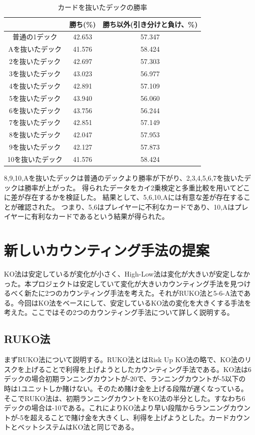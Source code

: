 \begin{table}[H]
 \caption{カードを抜いたデックの勝率\label{pullcard}}
 \begin{center}
  \begin{tabular}{|c|c|c|}
  \hline & 勝ち(\%) & 勝ち以外(引き分けと負け、\%) \\
  \hline 普通の1デック & 42.653 & 57.347\\
  \hline Aを抜いたデック & 41.576 & 58.424\\
  \hline 2を抜いたデック & 42.697 & 57.303\\
  \hline 3を抜いたデック & 43.023 & 56.977\\
  \hline 4を抜いたデック & 42.891 & 57.109\\
  \hline 5を抜いたデック & 43.940 & 56.060\\
  \hline 6を抜いたデック & 43.756 & 56.244\\
  \hline 7を抜いたデック & 42.851 & 57.149\\
  \hline 8を抜いたデック & 42.047 & 57.953\\
  \hline 9を抜いたデック & 42.127 & 57.873\\
  \hline 10を抜いたデック & 41.576 & 58.424\\
  \hline
  \end{tabular}
 \end{center}
\end{table}

8,9,10,Aを抜いたデックは普通のデックより勝率が下がり、2,3,4,5,6,7を抜いたデックは勝率が上がった。
得られたデータをカイ2乗検定と多重比較を用いてどこに差が存在するかを検証した。
結果として、5,6,10,Aには有意な差が存在することが確認された。
つまり、5,6はプレイヤーに不利なカードであり、10,Aはプレイヤーに有利なカードであるという結果が得られた。

\section{新しいカウンティング手法の提案}
KO法は安定しているが変化が小さく、High-Low法は変化が大きいが安定しなかった。本プロジェクトは安定していて変化が大きいカウンティング手法を見つけるべく新たに2つのカウンティング手法を考えた。それがRUKO法と5-6-A法である。今回はKO法をベースにして、安定しているKO法の変化を大きくする手法を考えた。ここではその2つのカウンティング手法について詳しく説明する。

\subsection{RUKO法}
まずRUKO法について説明する。RUKO法とはRisk Up KO法の略で、KO法のリスクを上げることで利得を上げようとしたカウンティング手法である。KO法は6デックの場合初期ランニングカウントが-20で、ランニングカウントが-5以下の時は1ユニットしか賭けない。そのため賭け金を上げる段階が遅くなっている。そこでRUKO法は、初期ランニングカウントをKO法の半分とした。すなわち6デックの場合は-10である。これによりKO法より早い段階からランニングカウントが-5を超えることで賭け金を大きくし、利得を上げようとした。カードカウントとベットシステムはKO法と同じである。

